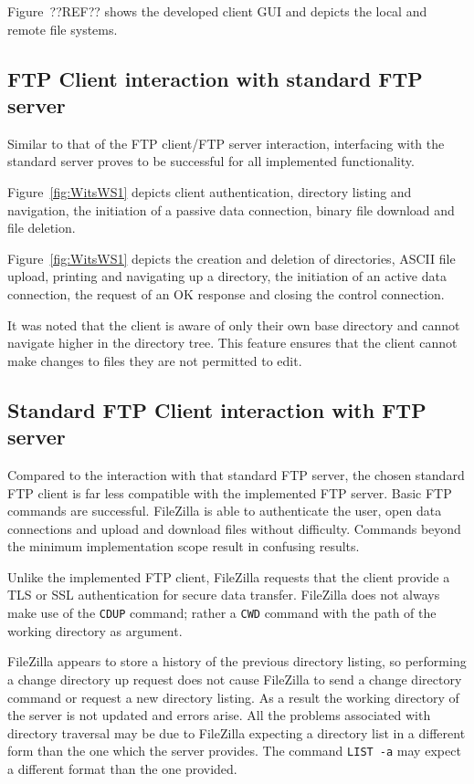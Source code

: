 \documentclass[10pt,twocolumn]{witseiepaper}
\begin{document}
Figure~??REF?? shows the developed client GUI and depicts the local and remote file systems. 

\subsection{FTP Client interaction with standard FTP server}

Similar to that of the FTP client/FTP server interaction, interfacing with the standard server proves to be successful for all implemented functionality. 

Figure~\ref{fig:WitsWS1} depicts client authentication, directory listing and navigation, the initiation of a passive data connection, binary file download and file deletion. 

Figure~\ref{fig:WitsWS1} depicts the creation and deletion of directories, ASCII file upload, printing and navigating up a directory, the initiation of an active data connection, the request of an OK response and closing the control connection.

It was noted that the client is aware of only their own base directory and cannot navigate higher in the directory tree. This feature ensures that the client cannot make changes to files they are not permitted to edit.

\subsection{Standard FTP Client interaction with FTP server}

Compared to the interaction with that standard FTP server, the chosen standard FTP client is far less compatible with the implemented FTP server. Basic FTP commands are successful. FileZilla is able to authenticate the user, open data connections and upload and download files without difficulty. Commands beyond the minimum implementation scope result in confusing results.

Unlike the implemented FTP client, FileZilla requests that the client provide a TLS or SSL authentication for secure data transfer. FileZilla does not always make use of the \texttt{CDUP} command; rather a \texttt{CWD} command with the path of the working directory as argument. 

FileZilla appears to store a history of the previous directory listing, so performing a change directory up request does not cause FileZilla to send a change directory command or request a new directory listing. As a result the working directory of the server is not updated and errors arise. All the problems associated with directory traversal may be due to FileZilla expecting a directory list in a different form than the one which the server provides. The command \texttt{LIST~-a} may expect a different format than the one provided.
\end{document}
